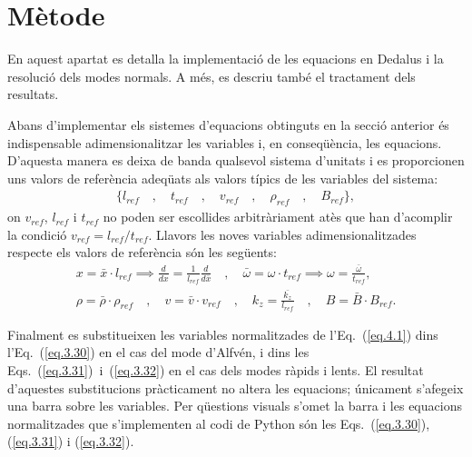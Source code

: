 
\chapter{Mètode} \label{sec:mètode}
En aquest apartat es detalla la implementació de les equacions en Dedalus i la resolució dels modes normals.
A més, es descriu també el tractament dels resultats.

Abans d'implementar els sistemes d'equacions obtinguts en la secció anterior %
és indispensable adimensionalitzar les variables i, en conseqüència, les equacions.
D'aquesta manera es deixa de banda qualsevol sistema d'unitats i es proporcionen uns valors de referència adeqüats als valors típics de les variables del sistema:
\begin{align*}
	\bigl\{  l_{ref} \quad , \quad t_{ref} \quad , \quad v_{ref} \quad , \quad \rho_{ref} \quad , \quad B_{ref} \bigr\},
\end{align*}
on $v_{ref}$, $l_{ref}$ i $t_{ref}$ no poden ser escollides arbitràriament atès que han d'acomplir la condició $v_{ref} = l_{ref} / t_{ref}$.
Llavors les noves variables adimensionalitzades respecte els valors de referència són les següents:
\begin{equation}
	\begin{gathered}
		x = \bar{x} \cdot l_{ref}  \implies \frac{d}{dx} = \frac{1}{l_{ref}} \frac{d}{d \bar{x}} \quad , \quad \bar{\omega} = \omega \cdot t_{ref} \implies \omega = \frac{\bar{\omega}}{t_{ref}}, \\
		\rho = \bar{\rho} \cdot \rho_{ref} \quad , \quad v = \bar{v} \cdot v_{ref} \quad , \quad k_z = \frac{\bar{k_z}}{l_{ref}} \quad , \quad B = \bar{B} \cdot B_{ref}.
	\end{gathered}
	\tag{4.1} \label{eq.4.1}
\end{equation}

Finalment es substitueixen les variables normalitzades de l'Eq.~(\ref{eq.4.1}) dins l'Eq.~(\ref{eq.3.30}) en el cas del mode d'Alfvén,
i dins les Eqs.~(\ref{eq.3.31})~i~(\ref{eq.3.32}) en el cas dels modes ràpids i lents.
El resultat d'aquestes substitucions pràcticament no altera les equacions; únicament s'afegeix una barra sobre les variables.
Per qüestions visuals s'omet la barra i les equacions normalitzades que s'implementen al codi de Python són les Eqs.~(\ref{eq.3.30}), (\ref{eq.3.31}) i (\ref{eq.3.32}).

